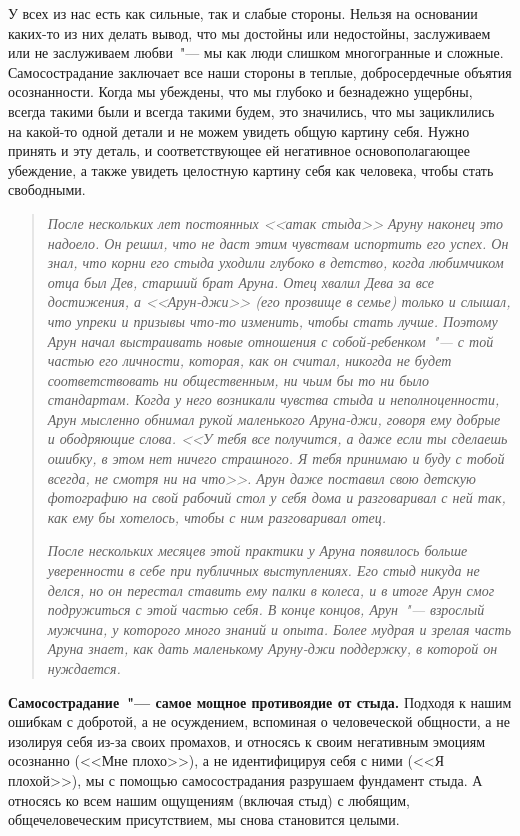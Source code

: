 У всех из нас есть как сильные, так и слабые стороны. Нельзя на основании каких-то из них делать вывод, что мы достойны или недостойны, заслуживаем или не заслуживаем любви~"--- мы как люди слишком многогранные и сложные. Самосострадание заключает все наши стороны в теплые, добросердечные объятия осознанности. Когда мы убеждены, что мы глубоко и безнадежно ущербны, всегда такими были и всегда такими будем, это значились, что мы зациклились на какой-то одной детали и не можем увидеть общую картину себя.  Нужно принять и эту деталь, и соответствующее ей негативное основополагающее убеждение, а также увидеть целостную картину себя как человека, чтобы стать свободными. 

\begin{quotation}
	\textit{
		После нескольких лет постоянных <<атак стыда>> Аруну наконец это надоело. Он решил, что не даст этим чувствам испортить его успех. Он знал, что корни его стыда уходили глубоко в детство, когда любимчиком отца был Дев, старший брат Аруна. Отец хвалил Дева за все достижения, а <<Арун-джи>> (его прозвище в семье) только и слышал, что упреки и призывы что-то изменить, чтобы стать лучше. Поэтому Арун начал выстраивать новые отношения с собой-ребенком~"--- с той частью его личности, которая, как он считал, никогда не будет соответствовать ни общественным, ни чьим бы то ни было стандартам. Когда у него возникали чувства стыда и неполноценности, Арун мысленно обнимал рукой маленького Аруна-джи, говоря ему добрые и ободряющие слова. <<У тебя все получится, а даже если ты сделаешь ошибку, в этом нет ничего страшного. Я тебя принимаю и буду с тобой всегда, не смотря ни на что>>. Арун даже поставил свою детскую фотографию на свой рабочий стол у себя дома и разговаривал с ней так, как ему бы хотелось, чтобы с ним разговаривал отец.
	}
	
	\textit{
		После нескольких месяцев этой практики у Аруна появилось больше уверенности в себе при публичных выступлениях. Его стыд никуда не делся, но он перестал ставить ему палки в колеса, и в итоге Арун смог подружиться с этой частью себя. В конце концов, Арун~"--- взрослый мужчина, у которого много знаний и опыта. Более мудрая и зрелая часть Аруна знает, как дать маленькому Аруну-джи поддержку, в которой он нуждается.
	}
\end{quotation}

\textbf{Самосострадание~"--- самое мощное противоядие от стыда.} Подходя к нашим ошибкам с добротой, а не осуждением, вспоминая о человеческой общности, а не изолируя себя из-за своих промахов, и относясь к своим негативным эмоциям осознанно (<<Мне плохо>>), а не идентифицируя себя с ними (<<Я плохой>>), мы с помощью самосострадания разрушаем фундамент стыда. А относясь ко всем нашим ощущениям (включая стыд) с любящим, общечеловеческим присутствием, мы снова становится целыми. 

